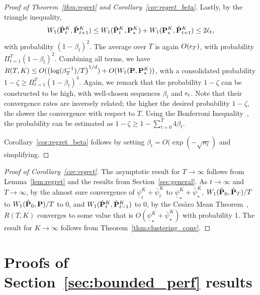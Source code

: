 \begin{proof}[Proof of Theorem~\ref{thm:regret} and Corollary~\ref{cor:regret_beta}]
Lastly, by the triangle inequality,
$$W_1(\hat{{\mathbf P}}^K_t,\hat{{\mathbf P}}^K_{t+1}) \leq W_1(\hat{{\mathbf P}}^K_t,{\mathbf P}^K_\star) + W_1({\mathbf P}^K_\star,\hat{{\mathbf P}}^K_{t+1}) \leq 2\tilde{\epsilon}_{t},$$
with probability $(1-\beta_{t})^2$.
The average over $T$ is again $O(\epsilon_{T})$, with probability $\Pi_{t=1}^{T}(1-\beta_t)^2$.
Combining all terms, we have $R(T,K) \leq O(\left(\log(\beta_T^{-1})/T\right)^{1/d})+ O(W_1({\mathbf P},{\mathbf P}^K_\star))$, with a consolidated probability $1-\zeta \geq \Pi_{t=1}^T(1-\beta_t)^4$. Again, we remark that the probability $1-\zeta$ can be constructed to be high, with well-chosen sequences $\beta_t$ and $\epsilon_t$. Note that their convergence rates are inversely related; the higher the desired probability $1-\zeta$, the slower the convergence with respect to $T$. Using the Bonferroni Inequality~\cite{Bonferroni}, the probability can be estimated as $1-\zeta \geq 1-\sum_{t=0}^T4\beta_t$.

Corollary~\ref{cor:regret_beta} follows by setting $\beta_t = O(\exp(-\sqrt{n_t})$ and simplifying.
\end{proof}


\begin{proof}[Proof of Corollary~\ref{cor:regret}]
    The asymptotic result for $T \rightarrow \infty$ follows from Lemma~\ref{lem:regret} and the results from Section~\ref{sec:general}.
   As $t \to \infty$ and $T\to\infty$, by the almost sure convergence of 
     $\underline{\psi}_t^K + \bar{\psi}_t^K$ to $\underline{\psi}_\star^K + \bar{\psi}_\star^K$,
    $W_1(\hat{{\mathbf P}}_0,\hat{{\mathbf P}}_T)/T$ to $W_1(\hat{{\mathbf P}}_0,{{\mathbf P}})/T$ to $0$, and $ W_1(\hat{{\mathbf P}}^K_t,\hat{{\mathbf P}}^K_{t-1})$ to $0$, by the Ces\`aro Mean Theorem~\cite{cesaro}, 
    $R(T,K)$ converges to some value that is $O(\underline{\psi}_
    \star^K + \bar{\psi}_\star^K)$ with probability 1. 
The result for $K \rightarrow \infty$ follows from Theorem~\ref{thm:clustering_conv}.
\end{proof}


\section{Proofs of Section~\ref{sec:bounded_perf} results}

